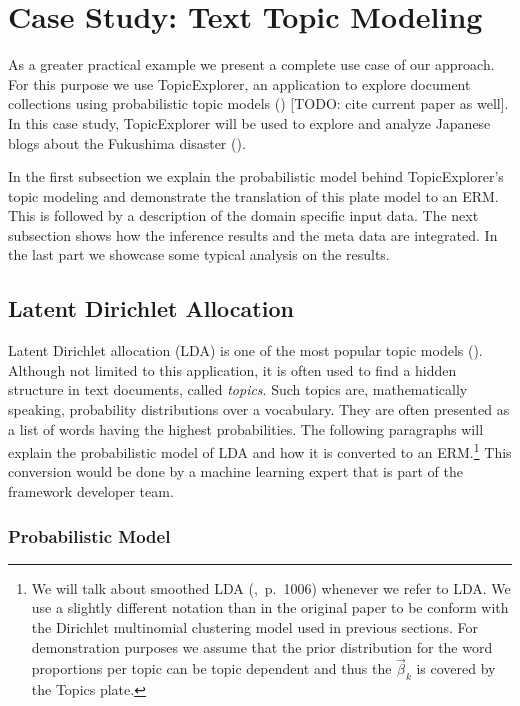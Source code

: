 \section{Case Study: Text Topic Modeling}\label{sec:casestudy}

As a greater practical example we present a complete use case of our approach. For this purpose we use TopicExplorer, an application to explore document collections using probabilistic topic models (\cite{hinneburg2012topicexplorer}) [TODO: cite current paper as well]. In this case study, TopicExplorer will be used to explore and analyze Japanese blogs about the Fukushima disaster (\cite{ines2011fukushima}).

In the first subsection we explain the probabilistic model behind TopicExplorer's topic modeling and demonstrate the translation of this plate model to an ERM. This is followed by a description of the domain specific input data. The next subsection shows how the inference results and the meta data are integrated. In the last part we showcase some typical analysis on the results.

\subsection{Latent Dirichlet Allocation}

Latent Dirichlet allocation (LDA) is one of the most popular topic models (\cite{blei2003latent}). Although not limited to this application, it is often used to find a hidden structure in text documents, called \emph{topics}. Such topics are, mathematically speaking, probability distributions over a vocabulary. They are often presented as a list of words having the highest probabilities. The following paragraphs will explain the probabilistic model of LDA and how it is converted to an ERM.\footnote{We will talk about smoothed LDA (\cite{blei2003latent},~p.~1006) whenever we refer to LDA. We use a slightly different notation than in the original paper to be conform with the Dirichlet multinomial clustering model used in previous sections. For demonstration purposes we assume that the prior distribution for the word proportions per topic can be topic dependent and thus the $\vec \beta_k$ is covered by the Topics plate.} This conversion would be done by a machine learning expert that is part of the framework developer team.

\subsubsection{Probabilistic Model}

